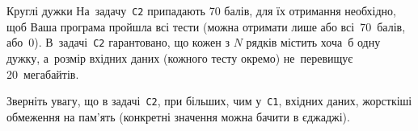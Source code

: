 \begin{problemAllDefault}{Круглі дужки}
На~задачу~\texttt{C2} припадають 70 балів, для їх отримання необхідно, щоб Ваша програма пройшла всі тести (можна отримати лише або всі~70~балів, або~0).
В~задачі~\texttt{C2} гарантовано, що кожен з $N$ рядків містить хоча~б одну дужку, а~розмір вхідних даних (кожного тесту окремо) не~перевищує 20~мегабайтів.

Зверніть увагу, що в задачі~\texttt{C2}, при більших, чим у~\texttt{C1}, вхідних даних, жорсткіші обмеження на пам'ять 
(конкретні значення 
можна бачити в єджаджі).
\end{problemAllDefault} 